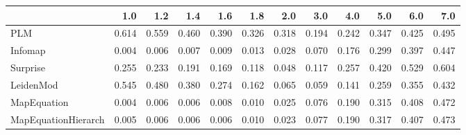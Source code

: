 \begin{tabular}{lrrrrrrrrrrr}
\toprule
{} &   1.0 &   1.2 &   1.4 &   1.6 &   1.8 &   2.0 &   3.0 &   4.0 &   5.0 &   6.0 &   7.0 \\
\midrule
PLM                 & 0.614 & 0.559 & 0.460 & 0.390 & 0.326 & 0.318 & 0.194 & 0.242 & 0.347 & 0.425 & 0.495 \\
Infomap             & 0.004 & 0.006 & 0.007 & 0.009 & 0.013 & 0.028 & 0.070 & 0.176 & 0.299 & 0.397 & 0.447 \\
Surprise            & 0.255 & 0.233 & 0.191 & 0.169 & 0.118 & 0.048 & 0.117 & 0.257 & 0.420 & 0.529 & 0.604 \\
LeidenMod           & 0.545 & 0.480 & 0.380 & 0.274 & 0.162 & 0.065 & 0.059 & 0.141 & 0.259 & 0.355 & 0.432 \\
MapEquation         & 0.004 & 0.006 & 0.006 & 0.008 & 0.010 & 0.025 & 0.076 & 0.190 & 0.315 & 0.408 & 0.472 \\
MapEquationHierarch & 0.005 & 0.006 & 0.006 & 0.006 & 0.010 & 0.023 & 0.077 & 0.190 & 0.317 & 0.407 & 0.473 \\
\bottomrule
\end{tabular}

